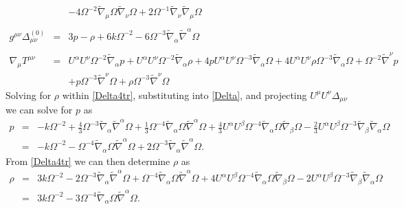 \documentclass[10pt,letterpaper]{article}
\numberwithin{equation}{section}
\begin{document}
\begin{eqnarray}
&& - 4 \Omega^{-2} \tilde{\nabla}_{\mu }\Omega \tilde{\nabla}_{\nu }\Omega + 2 \Omega^{-1} \tilde{\nabla}_{\nu }\tilde{\nabla}_{\mu }\Omega 
\label{Delta}
\\ \nonumber\\
g^{\mu\nu}\Delta_{\mu\nu}^{(0)}&=& 3 p -  \rho + 6 k \Omega^{-2} - 6 \Omega^{-3} \tilde{\nabla}_{\alpha }\tilde{\nabla}^{\alpha }\Omega 
\label{Delta4tr}
\\ \nonumber\\
\nabla_\mu T^{\mu \nu} &=&U^{\alpha } U^{\nu } \Omega^{-2} \tilde{\nabla}_{\alpha }p + U^{\alpha } U^{\nu } \Omega^{-2} \tilde{\nabla}_{\alpha }\rho + 4 p U^{\alpha } U^{\nu } \Omega^{-3} \tilde{\nabla}_{\alpha }\Omega + 4 U^{\alpha } U^{\nu } \rho \Omega^{-3} \tilde{\nabla}_{\alpha }\Omega + \Omega^{-2} \tilde{\nabla}^{\nu }p \nonumber \\ 
&& + p \Omega^{-3} \tilde{\nabla}^{\nu }\Omega + \rho \Omega^{-3} \tilde{\nabla}^{\nu }\Omega 
\end{eqnarray}
Solving for $\rho$ within \eqref{Delta4tr}, substituting into \eqref{Delta}, and projecting $U^\mu U^\nu \Delta_{\mu\nu}$ we can solve for $p$ as
\begin{eqnarray}
p &=& - k \Omega^{-2} + \tfrac{4}{3} \Omega^{-3} \tilde{\nabla}_{\alpha }\tilde{\nabla}^{\alpha }\Omega + \tfrac{1}{3} \Omega^{-4} \tilde{\nabla}_{\alpha }\Omega \tilde{\nabla}^{\alpha }\Omega + \tfrac{4}{3} U^{\alpha } U^{\beta } \Omega^{-4} \tilde{\nabla}_{\alpha }\Omega \tilde{\nabla}_{\beta }\Omega -  \tfrac{2}{3} U^{\alpha } U^{\beta } \Omega^{-3} \tilde{\nabla}_{\beta }\tilde{\nabla}_{\alpha }\Omega 
\\ \nonumber
&=& -k\Omega^{-2} - \Omega^{-4} \tilde\nabla_\alpha \Omega \tilde\nabla^\alpha \Omega + 2\Omega^{-3}\tilde\nabla_\alpha\tilde\nabla^\alpha \Omega.
\end{eqnarray}
From \eqref{Delta4tr} we can then determine $\rho$ as
\begin{eqnarray}
\rho &=& 3 k \Omega^{-2} - 2 \Omega^{-3} \tilde{\nabla}_{\alpha }\tilde{\nabla}^{\alpha }\Omega + \Omega^{-4} \tilde{\nabla}_{\alpha }\Omega \tilde{\nabla}^{\alpha }\Omega + 4 U^{\alpha } U^{\beta } \Omega^{-4} \tilde{\nabla}_{\alpha }\Omega \tilde{\nabla}_{\beta }\Omega - 2 U^{\alpha } U^{\beta } \Omega^{-3} \tilde{\nabla}_{\beta }\tilde{\nabla}_{\alpha }\Omega 
\nonumber\\
&=& 3 k \Omega^{-2} - 3 \Omega^{-4} \tilde{\nabla}_{\alpha }\Omega \tilde{\nabla}^{\alpha }\Omega. 
\end{eqnarray}
%
%
%
\end{document}
